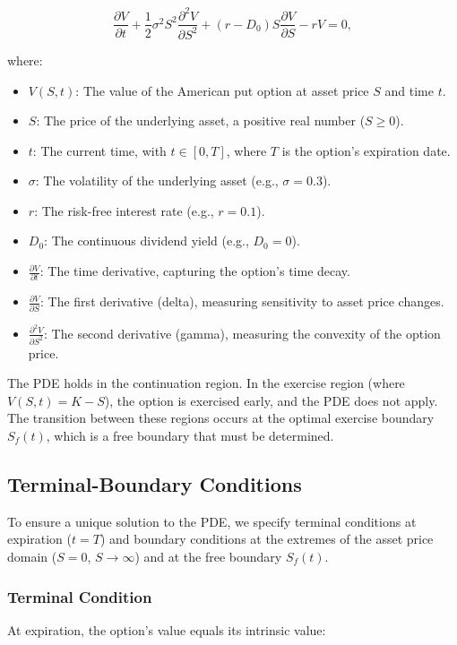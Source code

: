 \documentclass[12pt]{article}
\begin{document}
\begin{equation}
\frac{\partial V}{\partial t} + \frac{1}{2} \sigma^2 S^2 \frac{\partial^2 V}{\partial S^2} + (r - D_0) S \frac{\partial V}{\partial S} - r V = 0,
\end{equation}

where:
\begin{itemize}
    \item \( V(S, t) \): The value of the American put option at asset price \( S \) and time \( t \).
    \item \( S \): The price of the underlying asset, a positive real number (\( S \geq 0 \)).
    \item \( t \): The current time, with \( t \in [0, T] \), where \( T \) is the option's expiration date.
    \item \( \sigma \): The volatility of the underlying asset (e.g., \( \sigma = 0.3 \)).
    \item \( r \): The risk-free interest rate (e.g., \( r = 0.1 \)).
    \item \( D_0 \): The continuous dividend yield (e.g., \( D_0 = 0 \)).
    \item \( \frac{\partial V}{\partial t} \): The time derivative, capturing the option's time decay.
    \item \( \frac{\partial V}{\partial S} \): The first derivative (delta), measuring sensitivity to asset price changes.
    \item \( \frac{\partial^2 V}{\partial S^2} \): The second derivative (gamma), measuring the convexity of the option price.
\end{itemize}

The PDE holds in the continuation region. In the exercise region (where \( V(S, t) = K - S \)), the option is exercised early, and the PDE does not apply. The transition between these regions occurs at the optimal exercise boundary \( S_f(t) \), which is a free boundary that must be determined.

\subsection{Terminal-Boundary Conditions}
To ensure a unique solution to the PDE, we specify terminal conditions at expiration (\( t = T \)) and boundary conditions at the extremes of the asset price domain (\( S = 0 \), \( S \to \infty \)) and at the free boundary \( S_f(t) \).

\subsubsection{Terminal Condition}
At expiration, the option's value equals its intrinsic value:
\end{document}
